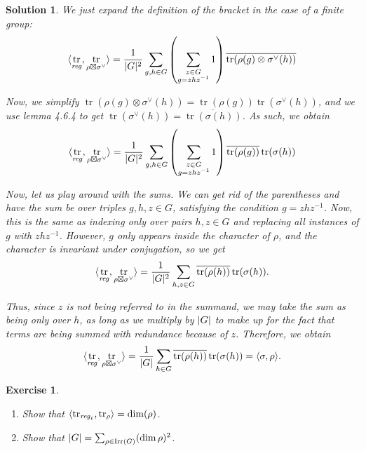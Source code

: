 \documentclass{article}
\newtheorem{ex}{Exercise}
\theoremstyle{nonumberplain}
\newtheorem{sol}{Solution}
\newcommand{\conj}[1]{\overline{#1}}
\newcommand{\reg}{\mathit{reg}}
\newcommand{\regl}{{\mathit{reg}_\ell}}
\newcommand{\cg}{\vee}
\DeclareMathOperator{\trace}{tr}
\DeclarePairedDelimiter{\abs}{\lvert}{\rvert}
\DeclarePairedDelimiter{\braket}{\langle}{\rangle}
\begin{document}
\begin{sol}
We just expand the definition of the bracket in the case of a finite group:
\begin{equation}
\braket{\trace_\reg, \trace_{\rho \boxtimes \sigma^\cg}} = \frac1{\abs{G}^2} \sum_{g, h \in G} \left( \sum_{\substack{z \in G \\ g = z h z^{-1}}} 1 \right) \conj{\trace(\rho(g) \otimes \sigma^{\cg}(h))}
\end{equation}

Now, we simplify $\trace(\rho(g) \otimes \sigma^\cg(h)) = \trace(\rho(g)) \trace(\sigma^\cg(h))$, and we use lemma 4.6.4 to get $\trace(\sigma^\cg(h)) = \conj{\trace(\sigma(h))}$. As such, we obtain
\begin{equation}
\braket{\trace_\reg, \trace_{\rho \boxtimes \sigma^\cg}} = \frac1{\abs{G}^2} \sum_{g, h \in G} \left( \sum_{\substack{z \in G \\ g = z h z^{-1}}} 1 \right) \conj{\trace(\rho(g))}\trace(\sigma(h))
\end{equation}

Now, let us play around with the sums. We can get rid of the parentheses and have the sum be over triples $g, h, z \in G$, satisfying the condition $g = z h z^{-1}$. Now, this is the same as indexing only over pairs $h, z \in G$ and replacing all instances of $g$ with $z h z^{-1}$. However, $g$ only appears inside the character of $\rho$, and the character is invariant under conjugation, so we get
\begin{equation}
\braket{\trace_\reg, \trace_{\rho \boxtimes \sigma^\cg}} = \frac1{\abs{G}^2} \sum_{h, z \in G} \conj{\trace(\rho(h))}\trace(\sigma(h)).
\end{equation}

Thus, since $z$ is not being referred to in the summand, we may take the sum as being only over $h$, as long as we multiply by $\abs{G}$ to make up for the fact that terms are being summed with redundance because of $z$. Therefore, we obtain
\begin{equation}
\braket{\trace_\reg, \trace_{\rho \boxtimes \sigma^\cg}} = \frac1{\abs{G}} \sum_{h \in G} \conj{\trace(\rho(h))}\trace(\sigma(h)) = \braket{\sigma, \rho}.
\end{equation}
\end{sol}

\begin{ex}
\leavevmode
\begin{enumerate}
\item Show that $\braket{\trace_\regl, \trace_\rho} = \dim(\rho)$.
\item Show that $\abs{G} = \sum_{\rho \in \textrm{Irr}(G)} (\dim \rho)^2$.
\end{enumerate}
\end{ex}
\end{document}

